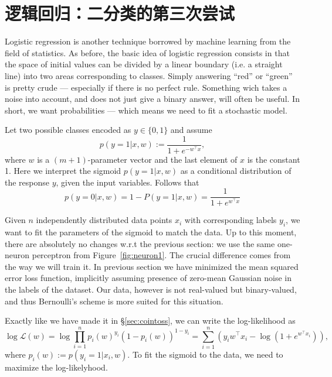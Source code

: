 \documentclass[notitlepage,oneside]{book}
\begin{document}
\section{逻辑回归：二分类的第三次尝试}
\label{sec:logistic-regression}

Logistic regression is another technique borrowed by machine learning from the field of statistics.
As before, the basic idea of logistic regression consists in that the space of initial values can be divided by a
linear boundary (i.e. a straight line) into two areas corresponding to classes.
Simply answering ``red'' or ``green'' is pretty crude --- especially if there is no perfect rule.
Something wich takes a noise into account, and does not just give a binary answer, will often be useful.
In short, we want probabilities --- which means we need to fit a stochastic model.

Let two possible classes encoded as $y \in \{0,1\}$ and assume
\begin{equation}
\label{eq:logitproba}
p(y=1|x,w) := \frac{1}{1+e^{-w^\top x}},
\end{equation}
where $w$ is a $(m+1)$-parameter vector and the last element of $x$ is the constant 1.
Here we interpret the sigmoid $p(y=1|x,w)$ as a conditional distribution of the response $y$, given the input variables. 
Follows that
$$
p(y=0|x,w) = 1-P(y=1|x,w) = \frac{1}{1+e^{w^\top x}}
$$

Given $n$ independently distributed data points $x_i$ with corresponding labels $y_i$, we want to fit the parameters of the sigmoid to match the data.
Up to this moment, there are absolutely no changes w.r.t the previous section: we use the same one-neuron perceptron from Figure~\ref{fig:neuron1}.
The crucial difference comes from the way we will train it.
In previous section we have minimized the mean squared error loss function, implicitly assuming presence of zero-mean Gaussian noise in the labels of the dataset.
Our data, however is not real-valued but binary-valued, and thus Bernoulli's scheme is more suited for this situation.

Exactly like we have made it in \S\ref{sec:cointoss}, we can write the log-likelihood as
$$
\log \mathcal{L}(w) = \log \prod_{i=1}^n p_i(w)^{y_i}  (1-p_i(w))^{1-y_i} = \sum_{i=1}^n \left(y_i w^\top x_i - \log\left(1+e^{w^\top x_i}\right)\right),
$$
where $p_i(w):=p(y_i=1|x_i, w)$. To fit the sigmoid to the data, we need to maximize the log-likelyhood.
\end{document}
